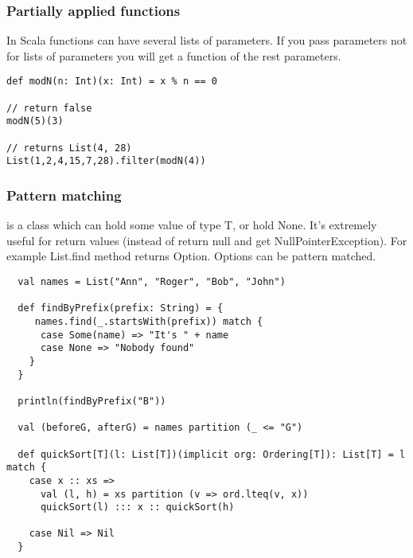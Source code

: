 \documentclass{beamer}
\begin{document}
\begin{frame}[fragile]
\frametitle{Partially applied functions}

In Scala functions can have several lists of parameters. If you pass parameters not for lists of parameters
you will get a function of the rest parameters.

\begin{example}
\begin{lstlisting}
def modN(n: Int)(x: Int) = x % n == 0

// return false
modN(5)(3)

// returns List(4, 28)
List(1,2,4,15,7,28).filter(modN(4))
\end{lstlisting}
\end{example}
\end{frame}

\begin{frame}[fragile]
\frametitle{Pattern matching}

 is a class which can hold some value of type T, or hold None. It's extremely useful for return values
(instead of return null and get NullPointerException). For example List.find method returns Option. Options can be pattern matched.

\begin{lstlisting}
  val names = List("Ann", "Roger", "Bob", "John")

  def findByPrefix(prefix: String) = {
     names.find(_.startsWith(prefix)) match {
      case Some(name) => "It's " + name
      case None => "Nobody found"
    }
  }

  println(findByPrefix("B"))

  val (beforeG, afterG) = names partition (_ <= "G")

  def quickSort[T](l: List[T])(implicit org: Ordering[T]): List[T] = l match {
    case x :: xs => 
      val (l, h) = xs partition (v => ord.lteq(v, x))
      quickSort(l) ::: x :: quickSort(h)

    case Nil => Nil
  }
\end{lstlisting}

\end{frame}
\end{document}
